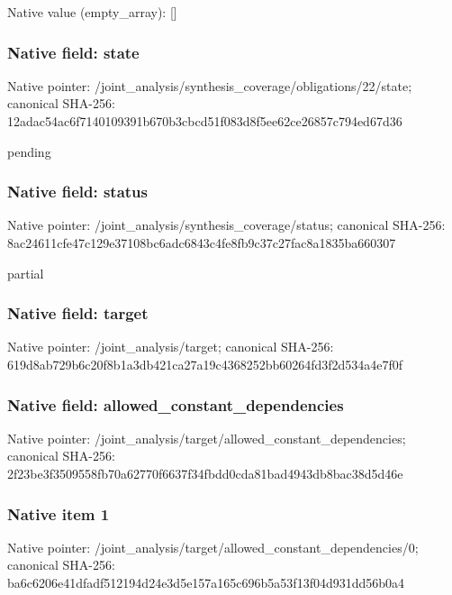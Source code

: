 \documentclass[10pt,a4paper]{article}
\begin{document}
Native value (empty\_\allowbreak{}array): []

\subsubsection{Native field: state}
Native pointer: /joint\_\allowbreak{}analysis/synthesis\_\allowbreak{}coverage/obligations/22/state; canonical SHA-256: 12adac54ac6f7140109391b670b3cbcd51f083d8f5ee62ce26857c794ed67d36

\begingroup\raggedright\sloppy pending\par\endgroup

\subsubsection{Native field: status}
Native pointer: /joint\_\allowbreak{}analysis/synthesis\_\allowbreak{}coverage/status; canonical SHA-256: 8ac24611cfe47c129e37108bc6adc6843c4fe8fb9c37c27fac8a1835ba660307

\begingroup\raggedright\sloppy partial\par\endgroup

\subsubsection{Native field: target}
Native pointer: /joint\_\allowbreak{}analysis/target; canonical SHA-256: 619d8ab729b6c20f8b1a3db421ca27a19c4368252bb60264fd3f2d534a4e7f0f

\subsubsection{Native field: allowed\_\allowbreak{}constant\_\allowbreak{}dependencies}
Native pointer: /joint\_\allowbreak{}analysis/target/allowed\_\allowbreak{}constant\_\allowbreak{}dependencies; canonical SHA-256: 2f23be3f3509558fb70a62770f6637f34fbdd0cda81bad4943db8bac38d5d46e

\subsubsection{Native item 1}
Native pointer: /joint\_\allowbreak{}analysis/target/allowed\_\allowbreak{}constant\_\allowbreak{}dependencies/0; canonical SHA-256: ba6c6206e41dfadf512194d24e3d5e157a165c696b5a53f13f04d931dd56b0a4
\end{document}
